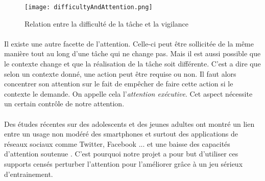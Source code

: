 \begin{figure}[H]
    \begin{center}
    \texttt{[image: difficultyAndAttention.png]}
    \end{center}
    \caption{Relation entre la difficulté de la tâche et la vigilance}
\label{DifficultyAndAttention}
\end{figure}

\paragraph{}Il existe une autre facette de l'attention. Celle-ci peut être sollicitée de la même manière tout au long d'une tâche qui ne change pas. Mais il est aussi possible que le
contexte change et que la réalisation de la tâche soit différente. C'est a dire que selon un contexte donné, une action peut être requise ou non. Il faut alors concentrer son
attention sur le fait de empêcher de faire cette action si le contexte le demande. On appelle cela l'\emph{attention exécutive}. Cet aspect nécessite un certain contrôle de notre
attention.


\paragraph{}Des études récentes sur des adolescents et des jeunes adultes ont montré un lien entre un usage non modéré des smartphones et surtout des applications de réseaux sociaux
comme Twitter, Facebook ... et une baisse des capacités d'attention soutenue \cite{ART01}. C'est pourquoi notre projet a pour but d'utiliser ces supports censés perturber l'attention
pour l'améliorer grâce à un jeu sérieux d'entrainement.